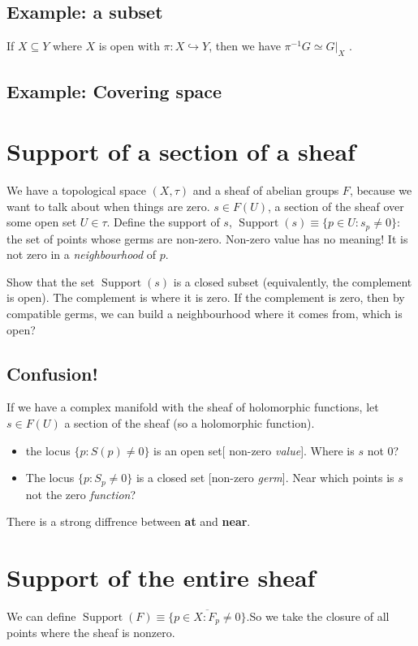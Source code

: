\documentclass{book}
\newcommand{\inv}{\ensuremath{-1}}
\newcommand{\piinv}{\ensuremath{\pi^\inv}}
\newcommand{\supp}{\operatorname{Support}}
\theoremstyle{definition}
\begin{document}
\subsection{Example: a subset}

If $X \subseteq Y$ where $X$ is open with $\pi: X \hookrightarrow Y$,
then we have $\piinv G \simeq G|_X$ .

\subsection{Example: Covering space}

\section{Support of a section of a sheaf}

We have a topological space $(X, \tau)$ and a sheaf of abelian groups $F$,
because we want to talk about when things are zero. $s \in F(U)$, a section
of the sheaf over some open set $U \in \tau$. Define the support of $s$,
$\supp(s) \equiv \{ p \in U: s_p \neq 0 \}$: the set of points whose
germs are non-zero. Non-zero value has no meaning! It is not zero in a 
\emph{neighbourhood} of $p$.

Show that the set $\supp(s)$ is a closed subset (equivalently, the complement is open).
The complement is where it is zero. If the complement is zero, then by compatible
germs, we can build a neighbourhood where it comes from, which is open?

\subsection{Confusion!}

If we have a complex manifold with the sheaf of holomorphic functions,
let $s \in F(U)$ a section of the sheaf (so a holomorphic function).
\begin{itemize}
    \item the locus $\{ p : S(p) \neq 0 \}$ is an open set[ non-zero \emph{value}].
        Where is $s$ not $0$?

    \item The locus $\{ p : S_p \neq 0 \}$ is a closed set [non-zero \emph{germ}]. 
        Near which points is $s$ not the zero \emph{function}?
\end{itemize}
There is a strong diffrence between \textbf{at} and \textbf{near}.

\section{Support of the entire sheaf}
We can define $\supp(F) \equiv \overline{\{ p \in X : F_p \neq 0 \}}$.So we
take the closure of all points where the sheaf is nonzero.
\end{document}
